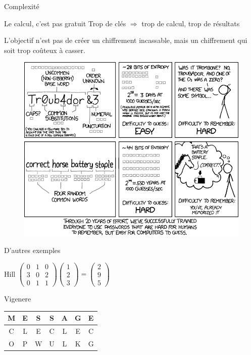 \documentclass{beamer}
\begin{document}
\begin{frame}{Complexité}

  \begin{alertblock}{Le calcul, c'est pas gratuit}
    Trop de clés $\Rightarrow$ trop de calcul, trop de résultats
\end{alertblock}
  L'objectif n'est pas de créer un chiffrement incassable, mais un chiffrement qui soit trop coûteux à casser.

  
  \begin{figure}
  \centering
  \includegraphics[scale = 0.2]{xkcdpassword_strength.png}
  \end{figure}
  \end{frame}

\begin{frame}{D'autres exemples}
  \begin{block}{Hill}
\centering
    $\begin{pmatrix}
0 & 1 & 0\\
3 & 0 & 2\\
0 & 1 & 1
\end{pmatrix}
\begin{pmatrix}
1\\
2\\
3
\end{pmatrix}
=
\begin{pmatrix}
2\\
9\\
5
\end{pmatrix}$
\end{block}
  \begin{block}{Vigenere}
\centering
\begin{tabular}{ c c c c c c c }
M & E & S & S & A & G & E\\
\hline
C & L & E & C & L & E & C\\
\hline
O & P & W & U & L & K & G
\end{tabular}
\end{block}
  \end{frame}
\end{document}
